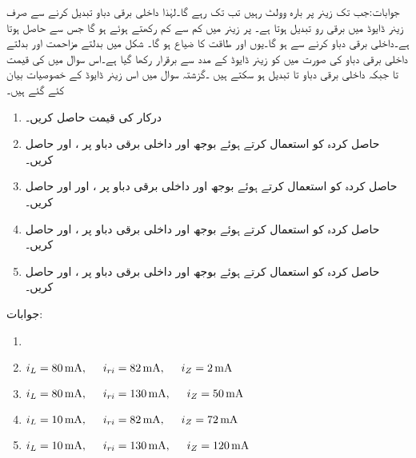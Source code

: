 %
جوابات:جب تک زینر پر بارہ وولٹ رہیں تب تک  رہے گا۔لہٰذا داخلی برقی دباو تبدیل کرنے سے صرف زینر ڈایوڈ میں برقی رو تبدیل ہوتا ہے۔ پر زینر میں کم سے کم  رکھتے ہوئے  ہو گا جس سے  حاصل ہوتا ہے۔داخلی برقی دباو  کرنے سے  ہو گا۔یوں  اور طاقت کا ضیاع  ہو گا۔
شکل   میں بدلتے مزاحمت  اور بدلتے داخلی برقی دباو کی صورت میں  کو زینر ڈایوڈ کے مدد سے برقرار رکھا گیا ہے۔اس سوال میں  کی قیمت  تا  جبکہ داخلی برقی دباو  تا  تبدیل ہو سکتے ہیں  ۔گزشتہ سوال میں اس زینر ڈایوڈ کے خصوصیات بیان کئے گئے ہیں۔
\begin{enumerate}
\item
درکار  کی قیمت حاصل کریں۔
\item
حاصل کردہ  کو استعمال کرتے ہوئے  بوجھ اور  داخلی برقی دباو پر ،   اور  حاصل کریں۔
\item
حاصل کردہ  کو استعمال کرتے ہوئے  بوجھ اور  داخلی برقی دباو پر ،   اور  اور حاصل کریں۔
\item
حاصل کردہ  کو استعمال کرتے ہوئے  بوجھ اور  داخلی برقی دباو پر ،   اور   حاصل کریں۔
\item
حاصل کردہ  کو استعمال کرتے ہوئے  بوجھ اور  داخلی برقی دباو پر ،  اور  حاصل کریں۔
\end{enumerate}
جوابات:
\begin{enumerate}
\item
{}
\item
$i_L=\SI{80}{\milli \ampere}, \hspace{5mm} i_{ri}=\SI{82}{\milli \ampere }, \hspace{5mm} i_Z=\SI{2}{\milli \ampere}$
\item
$i_L=\SI{80}{\milli \ampere}, \hspace{5mm} i_{ri}=\SI{130}{\milli \ampere }, \hspace{5mm} i_Z=\SI{50}{\milli \ampere}$
\item
$i_L=\SI{10}{\milli \ampere}, \hspace{5mm} i_{ri}=\SI{82}{\milli \ampere }, \hspace{5mm} i_Z=\SI{72}{\milli \ampere}$
\item
$i_L=\SI{10}{\milli \ampere}, \hspace{5mm} i_{ri}=\SI{130}{\milli \ampere }, \hspace{5mm} i_Z=\SI{120}{\milli \ampere}$

\end{enumerate} 

